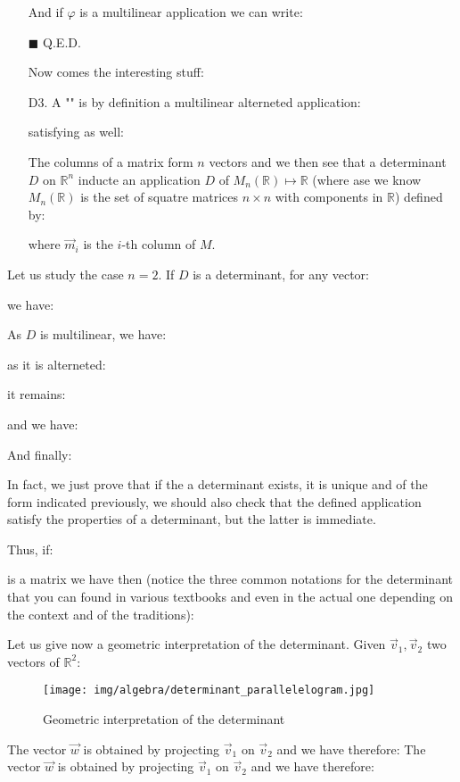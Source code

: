 \begin{enumerate}
\begin{dem}
		And if $\varphi$ is a multilinear application we can write:
		
		\begin{flushright}
			$\blacksquare$  Q.E.D.
		\end{flushright}
		\end{dem}
		Now comes the interesting stuff:
		
		\item[D3.]  A "" is by definition a multilinear alterneted application:
		
		satisfying as well:
		
		\begin{tcolorbox}[title=Remark,colframe=black,arc=10pt]
		The columns of a matrix form $n$ vectors and we then see that a determinant $D$ on $\mathbb{R}^n$ inducte an application $D$ of $M_n(\mathbb{R})\mapsto \mathbb{R}$ (where ase we know $M_n(\mathbb{R})$ is the set of squatre matrices $n\times n$ with components in $\mathbb{R}$) defined by:
		
		where $\vec{m}_i$ is the $i$-th column of $M$. 
		\end{tcolorbox}	
	\end{enumerate}
	Let us study the case $n=2$. If $D$ is a determinant, for any vector:
	
	we have:
	
	As $D$ is multilinear, we have:
	
	as it is alterneted:
	
	it remains:
	
	and we have:
	
	And finally:
	
	In fact, we just prove that if the a determinant exists, it is unique and of the form indicated previously, we should also check that the defined application satisfy the properties of a determinant, but the latter is immediate.
	
	Thus, if:
	
	is a matrix we have then (notice the three common notations for the determinant that you can found in various textbooks and even in the actual one depending on the context and of the traditions):
	
	Let us give now a geometric interpretation of the determinant. Given $\vec{v}_1,\vec{v}_2$ two vectors of $\mathbb{R}^2$:
	\begin{figure}[H]
		\centering
		\texttt{[image: img/algebra/determinant\_parallelelogram.jpg]}
		\caption{Geometric interpretation of the determinant}
	\end{figure}
	The vector $\vec{w}$ is obtained by projecting $\vec{v}_1$ on $\vec{v}_2$ and we have therefore:
	The vector $\vec{w}$ is obtained by projecting $\vec{v}_1$ on $\vec{v}_2$ and we have therefore:
	
